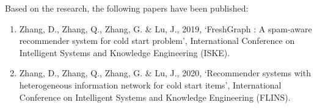 \bigskip
\bigskip
Based on the research, the following papers have been published:
\begin{enumerate}
    \item Zhang, D., Zhang, Q., Zhang, G. \& Lu, J., 2019,  ‘FreshGraph :  A spam-aware recommender system for cold start problem’, International Conference on Intelligent Systems and Knowledge Engineering (ISKE).
    \item Zhang, D., Zhang, Q., Zhang, G. \& Lu, J., 2020, ‘Recommender systems with heterogeneous information network for cold start items’, International Conference on Intelligent Systems and Knowledge Engineering (FLINS).
\end{enumerate}
 
